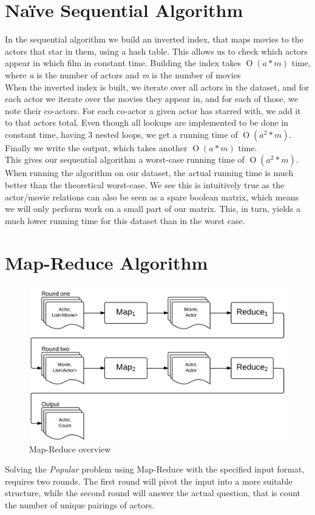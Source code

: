\documentclass[a4paper,11pt]{article}
\newcommand{\BigO}[1]{\ensuremath{\operatorname{O}\left(#1\right)}}
\begin{document}
\section{Naïve Sequential Algorithm}
\label{sub:sequential}
In the sequential algorithm we build an inverted index, that maps movies to the actors that star in them, using a hash table. This allows us to check which actors appear in which film in constant time. Building the index takes \BigO{a*m} time, where \emph{a} is the number of actors and \emph{m} is the number of movies\\

When the inverted index is built, we iterate over all actors in the dataset, and for each actor we iterate over the movies they appear in, and for each of those, we note their co-actors. For each co-actor a given actor has starred with, we add it to that actors total. Even though all lookups are implemented to be done in constant time, having 3 nested loops, we get a running time of \BigO{a^2*m}. Finally we write the output, which takes another \BigO{a*m} time.\\

This gives our sequential algorithm a worst-case running time of \BigO{a^2*m}. When running the algorithm on our dataset, the actual running time is much better than the theoretical worst-case. We see this is intuitively true as the actor/movie relations can also be seen as a spare boolean matrix, which means we will only perform work on a small part of our matrix. This, in turn, yields a much lower running time for this dataset than in the worst case.

\section{Map-Reduce Algorithm}
\label{sub:map-reduce}
\begin{figure}[H]
\centering \includegraphics[scale=0.2]{map-reduce-figure.png}
\vspace{-10pt}
\caption{Map-Reduce overview}
\label{fig:map-reduce}
\vspace{-10pt}
\end{figure}
Solving the \emph{Popular} problem using Map-Reduce with the specified input format, requires two rounds. The first round will pivot the input into a more suitable structure, while the second round will answer the actual question, that is count the number of unique pairings of actors.
\end{document}
